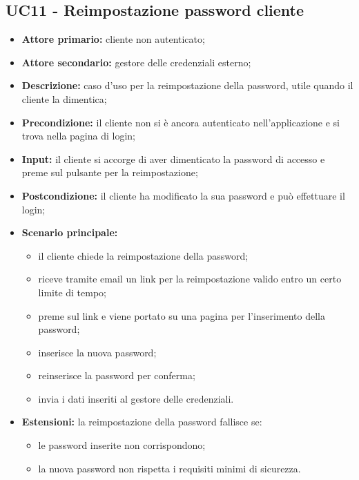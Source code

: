 \subsection{UC11 - Reimpostazione password cliente}
\label{UC11}
\begin{itemize}
    \item \textbf{Attore primario:} cliente non autenticato;
    \item \textbf{Attore secondario:} gestore delle credenziali esterno;
    \item \textbf{Descrizione:} caso d'uso per la reimpostazione della password, utile quando il cliente la dimentica;
    \item \textbf{Precondizione:} il cliente non si è ancora autenticato nell'applicazione e si trova nella pagina di login;
    \item \textbf{Input:} il cliente si accorge di aver dimenticato la password di accesso e preme sul pulsante per la reimpostazione;
    \item \textbf{Postcondizione:} il cliente ha modificato la sua password e può effettuare il login;
    \item \textbf{Scenario principale:}
    \begin{itemize}
        \item il cliente chiede la reimpostazione della password;
        \item riceve tramite email un link per la reimpostazione valido entro un certo limite di tempo;
        \item preme sul link e viene portato su una pagina per l'inserimento della password;
        \item inserisce la nuova password;
        \item reinserisce la password per conferma;
        \item invia i dati inseriti al gestore delle credenziali.
    \end{itemize}
    \item \textbf{Estensioni:} la reimpostazione della password fallisce se:
    \begin{itemize}
        \item le password inserite non corrispondono;
        \item la nuova password non rispetta i requisiti minimi di sicurezza.
    \end{itemize}
\end{itemize}

